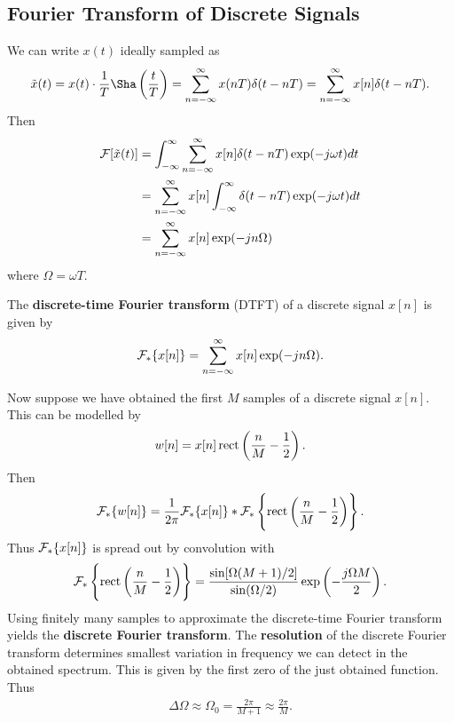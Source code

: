 \documentclass{memoir}
\begin{document}
\subsection{Fourier Transform of Discrete Signals}
We can write $x(t)$ ideally sampled as
\begin{align*}
    \tilde{x}(t) = x(t) \cdot \frac{1}{T}\Sha\left(\frac{t}{T}\right) = \sum_{n=-\infty}^{\infty} x(nT) \delta(t - nT) = \sum_{n=-\infty}^{\infty} x[n] \delta(t - nT).
\end{align*}
Then
\begin{align*}
    \mathcal{F}[\tilde{x}(t)] &= \int_{-\infty}^{\infty} \sum_{n=-\infty}^{\infty} x[n] \delta(t - nT) \exp(-j \omega t) dt \\
    &= \sum_{n=-\infty}^{\infty} x[n] \int_{-\infty}^{\infty}  \delta(t - nT) \exp(-j \omega t) dt \\
    &= \sum_{n=-\infty}^{\infty} x[n] \exp(-j n \Omega)
\end{align*}
where $\Omega = \omega T$.
\begin{definition}
    The \textbf{discrete-time Fourier transform} (DTFT) of a discrete signal $x[n]$ is given by
    \begin{align*}
        \mathcal{F}_*\{x[n]\} = \sum_{n=-\infty}^{\infty} x[n] \exp(-j n \Omega).
    \end{align*}
\end{definition}
Now suppose we have obtained the first $M$ samples of a discrete signal $x[n]$. This can be modelled by
\begin{align*}
    w[n] = x[n]\operatorname{rect}\left(\frac{n}{M} - \frac{1}{2}\right).
\end{align*}
Then
\begin{align*}
    \mathcal{F}_*\{w[n]\} = \frac{1}{2 \pi} \mathcal{F}_*\{x[n]\} \ast \mathcal{F}_*\left\{\operatorname{rect}\left(\frac{n}{M} - \frac{1}{2}\right)\right\}.
\end{align*}
Thus $\mathcal{F}_*\{x[n]\}$ is spread out by convolution with
\begin{align*}
    \mathcal{F}_*\left\{\operatorname{rect}\left(\frac{n}{M} - \frac{1}{2}\right)\right\} = \frac{\sin[\Omega(M+1)/2]}{\sin(\Omega/2)}\exp\left(-\frac{j \Omega M}{2}\right).
\end{align*}
Using finitely many samples to approximate the discrete-time Fourier transform yields the \textbf{discrete Fourier transform}. The \textbf{resolution} of the discrete Fourier transform determines smallest variation in frequency we can detect in the obtained spectrum. This is given by the first zero of the just obtained function. Thus
\begin{align*}
    \Delta \Omega \approx \Omega_0 = \frac{2 \pi}{M+1} \approx \frac{2 \pi}{M}.
\end{align*}
\end{document}
